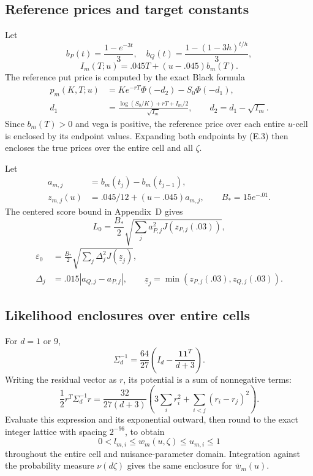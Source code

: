 \documentclass[11pt,a4paper]{article}
\begin{document}
\subsection{Reference prices and target constants}

Let
\[
b_P(t)=\frac{1-e^{-3t}}3,\quad
b_Q(t)=\frac{1-(1-3h)^{t/h}}3,
\]
\[
I_m(T;u)=.045T+(u-.045)b_m(T).
\]
The reference put price is computed by the exact Black formula
\[
\begin{aligned}
p_m(K,T;u)&=Ke^{-rT}\Phi(-d_2)-S_0\Phi(-d_1),\\
d_1&=\frac{\log(S_0/K)+rT+I_m/2}{\sqrt{I_m}},\qquad
d_2=d_1-\sqrt{I_m}.
\end{aligned}
\tag{F.2}
\]
Since \(b_m(T)>0\) and vega is positive, the reference price over each entire
\(u\)-cell is enclosed by its endpoint values.
Expanding both endpoints by (E.3) then encloses the true prices over the entire cell
and all \(\zeta\).

Let
\[
\begin{aligned}
a_{m,j}&=b_m(t_j)-b_m(t_{j-1}),\\
z_{m,j}(u)&=.045/12+(u-.045)a_{m,j},\qquad B_*=15e^{-.01}.
\end{aligned}
\]
The centered score bound in Appendix~D gives
\[
L_0=\frac{B_*}2
\sqrt{\sum_ja_{P,j}^2J(z_{P,j}(.03))},
\]
\[
\begin{aligned}
\varepsilon_0&=\frac{B_*}2
\sqrt{\sum_j\Delta_j^2J(\underline z_j)},\\
\Delta_j&=.015|a_{Q,j}-a_{P,j}|,\qquad
\underline z_j=\min(z_{P,j}(.03),z_{Q,j}(.03)).
\end{aligned}
\tag{F.3}
\]

\subsection{Likelihood enclosures over entire cells}

For \(d=1\) or 9,
\[
\Sigma_d^{-1}=\frac{64}{27}\left(I_d-\frac{\mathbf1\mathbf1^T}{d+3}\right).
\]
Writing the residual vector as \(r\), its potential is a sum of nonnegative terms:
\[
\frac12r^T\Sigma_d^{-1}r=
\frac{32}{27(d+3)}
\left(3\sum_i r_i^2+\sum_{i<j}(r_i-r_j)^2\right).
\tag{F.4}
\]
Evaluate this expression and its exponential outward, then round to the exact integer
lattice with spacing \(2^{-96}\), to obtain
\[
0<l_{m,i}\le w_m(u,\zeta)\le u_{m,i}\le1
\]
throughout the entire cell and nuisance-parameter domain.
Integration against the probability measure \(\nu(d\zeta)\) gives the same enclosure
for \(\bar w_m(u)\).
\end{document}
